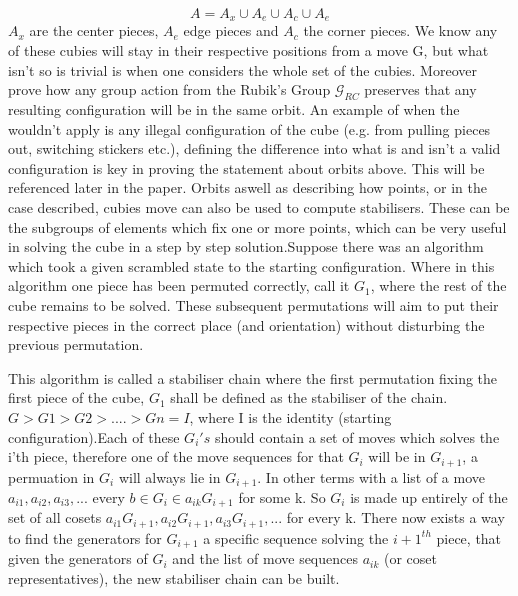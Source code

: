 \documentclass{article}
\newcounter{lem}[section]\setcounter{lem}{0}
\begin{document}
\begin{equation}
A = A_{x}\cup A_{e}\cup A_{c}\cup A_{e}
\end{equation} 
$A_{x}$ are the center pieces, $A_{e}$ edge pieces and $A_{c}$ the corner pieces. We know any of these cubies will stay in their respective positions from a move G, but what isn't so is trivial is when one considers the whole set of the cubies. Moreover prove how any group action from the Rubik's Group $\mathcal{G}_{RC}$ preserves that any resulting configuration will be in the same orbit. 
An example of when the wouldn't apply is any illegal configuration of the cube (e.g. from pulling pieces out, switching stickers etc.), defining the difference into what is and isn't a valid configuration is key in proving the statement about orbits above. This will be referenced later in the paper.
Orbits aswell as describing how points, or in the case described, cubies move can also be used to compute stabilisers. These can be the subgroups of elements which fix one or more points, which can be very useful in solving the cube in a step by step solution\cite{PermGroups}.\newline Suppose there was an algorithm which took a given scrambled state to the starting configuration. Where in this algorithm one piece has been permuted correctly, call it $G_{1}$, where the rest of the cube remains to be solved. These subsequent permutations will aim to put their respective pieces in the correct place (and orientation) without disturbing the previous permutation.   

This algorithm is called a stabiliser chain where the first permutation fixing the first piece of the cube, $G_{1}$ shall be defined as the stabiliser of the chain. $G > G1 > G2 > .... > Gn = I$, where I is the identity (starting configuration).Each of these $G_{i}'s$ should contain a set of moves which solves the i'th piece, therefore one of the move sequences for that $G_{i}$ will be in $G_{i+1}$, a permuation in $G_{i}$ will always lie in $G_{i+1}$. In other terms with a list  of a move $a_{i1},a_{i2},a_{i3}, ...$ every $b \in G_{i} \in a_{ik}G_{i+1}$ for some k. So $G_{i}$ is made up entirely of the set of all cosets $a_{i1}G_{i+1}, a_{i2}G_{i+1}, a_{i3}G_{i+1}, ... $ for every k. There now exists a way to find the generators for $G_{i+1}$ a specific sequence solving the ${i+1}^{th}$ piece, that given the generators of $G_{i}$ and the list of move sequences $a_{ik}$ (or coset representatives), the new stabiliser chain can be built\cite{Schreier}.
\end{document}
